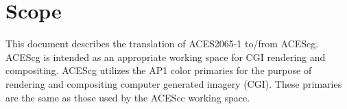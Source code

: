 \cleardoublepage
\numberedformat	
\chapter{Scope} 	%

This document describes the translation of ACES2065-1 to/from ACEScg. ACEScg is intended as an appropriate working space for CGI rendering and compositing. ACEScg utilizes the AP1 color primaries for the purpose of rendering and compositing computer generated imagery (CGI). These primaries are the same as those used by the ACEScc working space.